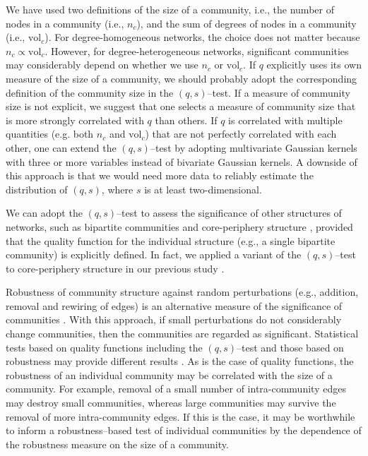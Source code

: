 \documentclass[fleqn,10pt]{wlscirep}
\def\vol{\text{vol}}
\begin{document}
We have used two definitions of the size of a community, i.e., the number of nodes in a community (i.e., $n_c$), and the sum of degrees of nodes in a community (i.e., $\vol_c$). 
For degree-homogeneous networks, the choice does not matter because $n_c \propto \vol_c$.  
However, for degree-heterogeneous networks, significant communities may considerably depend on whether we use $n_c$ or $\vol_c$. 
If $q$ explicitly uses its own measure of the size of a community, we should probably adopt the corresponding definition of the community size in the $(q, s)$--test. 
If a measure of community size is not explicit, we suggest that one selects a measure of community size that is more strongly correlated with $q$ than others.
If $q$ is correlated with multiple quantities (e.g. both $n_c$ and $\vol_c$) that are not perfectly correlated with each other, one can extend the $(q,s)$--test by adopting multivariate Gaussian kernels with three or more variables instead of bivariate Gaussian kernels.
A downside of this approach is that we would need more data to reliably estimate the distribution of $(q,s)$, where $s$ is at least two-dimensional.

We can adopt the $(q,s)$--test to assess the significance of other structures of networks, such as bipartite communities \cite{Newman2007} and core-periphery structure \cite{Borgatti2000,Rombach2017,Kojaku2017b}, provided that the quality function for the individual structure (e.g., a single bipartite community) is explicitly defined.
In fact, we applied a variant of the $(q, s)$--test to core-periphery structure in our previous study \cite{Kojaku2017b}.

Robustness of community structure against random perturbations (e.g., addition, removal and rewiring of edges) is an alternative measure of the significance of communities \cite{Gfeller2005,Karrer2008,Yang2015}.
With this approach, if small perturbations do not considerably change communities, then the communities are regarded as significant.
Statistical tests based on quality functions including the $(q, s)$--test and those based on robustness may provide different results \cite{Karrer2008}.
As is the case of quality functions, the robustness of an individual community may be correlated with the size of a community.
For example, removal of a small number of intra-community edges may destroy small communities, whereas large communities may survive the removal of more intra-community edges. 
If this is the case, it may be worthwhile to inform a robustness--based test of individual communities by the dependence of the robustness measure on the size of a community.
\end{document}
